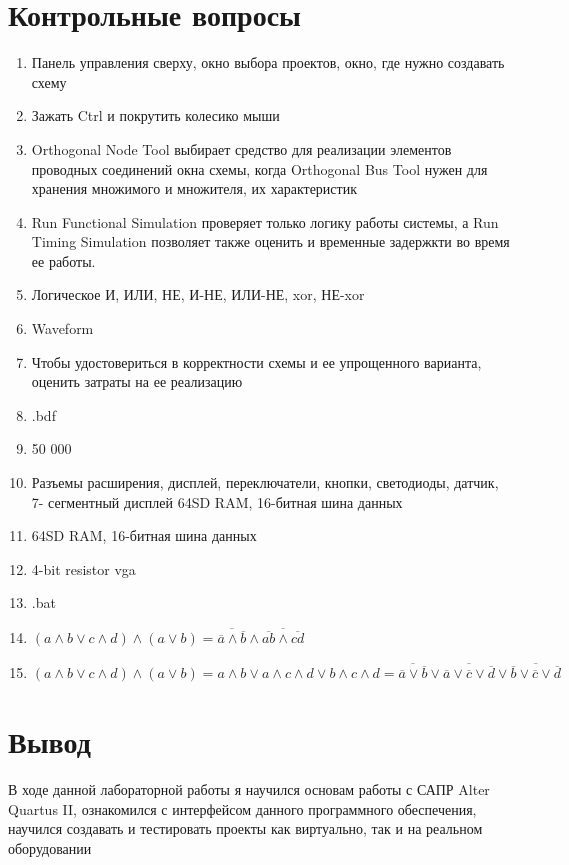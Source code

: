 \documentclass[a4paper,12pt]{article}
\begin{document}
  \section{Контрольные вопросы}

  \begin{enumerate}
    \item {
        Панель управления сверху, окно выбора проектов, окно, где нужно создавать схему
    }
    \item {
        Зажать Ctrl и покрутить колесико мыши
    }
    \item {
        Orthogonal Node Tool выбирает средство для реализации элементов проводных
        соединений окна схемы, когда Orthogonal Bus Tool нужен для хранения множимого и
        множителя, их характеристик
    }
    \item {
        Run Functional Simulation проверяет только логику работы системы, а Run Timing Simulation
        позволяет также оценить и временные задержкти во время ее работы.
    }
    \item {
        Логическое И, ИЛИ, НЕ, И-НЕ, ИЛИ-НЕ, xor, НЕ-xor
    }
    \item {
        Waveform
    }
    \item {
        Чтобы удостовериться в корректности схемы и ее упрощенного варианта, оценить затраты на ее реализацию
    }
    \item {
        .bdf
    }
    \item {
        50 000
    }
    \item {
        Разъемы расширения, дисплей, переключатели, кнопки, светодиоды, датчик, 7-
        сегментный дисплей 64SD RAM, 16-битная шина данных
    }
    \item {
        64SD RAM, 16-битная шина данных
    }
    \item {
        4-bit resistor vga
    }
    \item {
        .bat
    }
    \item {
        $(a\land b\lor c\land d)\land (a \lor b) = \overline{\overline{a}\land\overline{b}} \land \overline{\overline{ab}\land\overline{cd}}$
    }
    \item {
        $(a\land b\lor c\land d)\land (a \lor b) = a\land b \lor a\land c\land d \lor b\land c\land d =
        \overline{\overline{a} \lor \overline{b}} \lor \overline{\overline{a} \lor \overline{c} \lor \overline{d}} \lor
        \overline{\overline{b} \lor \overline{c} \lor \overline{d}}$
    }
  \end{enumerate}

  \section{Вывод}

  В ходе данной лабораторной работы я научился основам работы с САПР Alter Quartus II, ознакомился
  с интерфейсом данного программного обеспечения, научился создавать и тестировать проекты
  как виртуально, так и на реальном оборудовании
\end{document}
